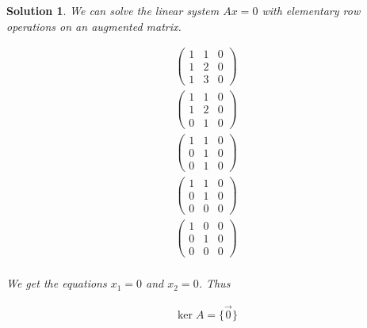 \documentclass{article}
\newtheorem*{solution}{Solution}
\begin{document}
\begin{solution}
We can solve the linear system $Ax = 0$ with elementary row operations on an augmented matrix.

\begin{align*}
\left( \begin{array}{cc|c}1 & 1 & 0 \\ 1 & 2 & 0 \\ 1 & 3 & 0 \end{array} \right) \\
\left( \begin{array}{cc|c}1 & 1 & 0 \\ 1 & 2 & 0 \\ 0 & 1 & 0 \end{array} \right) \\
\left( \begin{array}{cc|c}1 & 1 & 0 \\ 0 & 1 & 0 \\ 0 & 1 & 0 \end{array} \right) \\
\left( \begin{array}{cc|c}1 & 1 & 0 \\ 0 & 1 & 0 \\ 0 & 0 & 0 \end{array} \right) \\
\left( \begin{array}{cc|c}1 & 0 & 0 \\ 0 & 1 & 0 \\ 0 & 0 & 0 \end{array} \right) \\
\end{align*}

We get the equations $x_{1} = 0$ and $x_{2} = 0$. Thus 

\begin{align*}
\ker A = \{ \vec{0} \}
\end{align*}

\end{solution}
\end{document}
